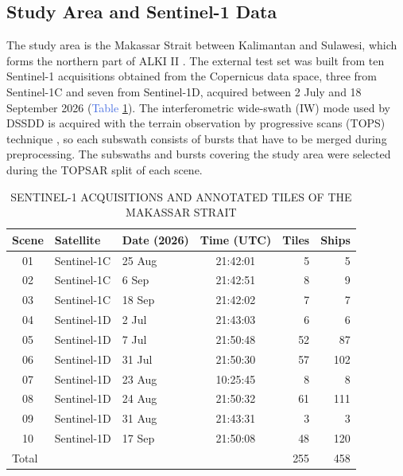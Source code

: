 \documentclass[conference]{IEEEtran}
\begin{document}
\subsection{Study Area and Sentinel-1 Data}
The study area is the Makassar Strait between Kalimantan and Sulawesi, which forms the northern part of ALKI II \cite{yulia2023}. The external test set was built from ten Sentinel-1 acquisitions obtained from the Copernicus data space, three from Sentinel-1C and seven from Sentinel-1D, acquired between 2 July and 18 September 2026 (\textcolor{RoyalBlue}{Table} \ref{tab:scenes}). The interferometric wide-swath (IW) mode used by DSSDD is acquired with the terrain observation by progressive scans (TOPS) technique \cite{dezan2006}, so each subswath consists of bursts that have to be merged during preprocessing. The subswaths and bursts covering the study area were selected during the TOPSAR split of each scene.

\begin{table}[h!]
	\centering
	\caption{SENTINEL-1 ACQUISITIONS AND ANNOTATED TILES OF THE MAKASSAR STRAIT}
	\begin{footnotesize}
	\setlength{\tabcolsep}{4pt}
	\begin{tabular}{cllcrr}
		\hline
		\textbf{Scene} & \textbf{Satellite} & \textbf{Date (2026)} & \textbf{Time (UTC)} & \textbf{Tiles} & \textbf{Ships} \\
		\hline
		01 & Sentinel-1C & 25 Aug & 21:42:01 & 5 & 5 \\
		02 & Sentinel-1C & 6 Sep & 21:42:51 & 8 & 9 \\
		03 & Sentinel-1C & 18 Sep & 21:42:02 & 7 & 7 \\
		04 & Sentinel-1D & 2 Jul & 21:43:03 & 6 & 6 \\
		05 & Sentinel-1D & 7 Jul & 21:50:48 & 52 & 87 \\
		06 & Sentinel-1D & 31 Jul & 21:50:30 & 57 & 102 \\
		07 & Sentinel-1D & 23 Aug & 10:25:45 & 8 & 8 \\
		08 & Sentinel-1D & 24 Aug & 21:50:32 & 61 & 111 \\
		09 & Sentinel-1D & 31 Aug & 21:43:31 & 3 & 3 \\
		10 & Sentinel-1D & 17 Sep & 21:50:08 & 48 & 120 \\
		\hline
		\multicolumn{4}{l}{Total} & 255 & 458 \\
		\hline
	\end{tabular}
	\label{tab:scenes}
	\end{footnotesize}
\end{table}
\end{document}
